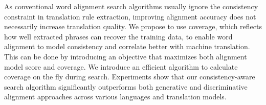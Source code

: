 As conventional word alignment search algorithms usually ignore the consistency constraint in translation rule extraction, improving alignment accuracy does not necessarily increase translation quality. We propose to use coverage, which reflects how well extracted phrases can recover the training data, to enable word alignment to model consistency and correlate better with machine translation. This can be done by introducing an objective that maximizes both alignment model score and coverage. We introduce an efficient algorithm to calculate coverage on the fly during search. Experiments show that our consistency-aware search algorithm significantly outperforms both generative and discriminative alignment approaches across various languages and translation models.
